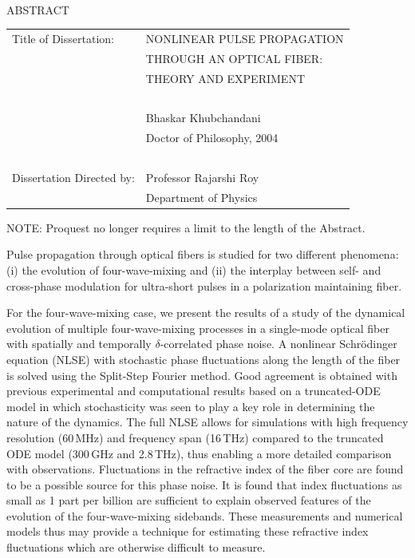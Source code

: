 
\hbox{\ } \vspace{.7in}
\renewcommand{\baselinestretch}{1}
\small \normalsize

\begin{center}
\large{{ABSTRACT}}

\vspace{3em}

\end{center}
\hspace{-.15in}
\begin{tabular}{ll}
Title of Dissertation:    & {\large  NONLINEAR PULSE PROPAGATION }\\
&                     {\large  THROUGH AN OPTICAL FIBER:} \\
&                     {\large  THEORY AND EXPERIMENT} \\
\ \\
&                          {\large  Bhaskar Khubchandani} \\
&                           {\large Doctor of Philosophy, 2004} \\
\ \\
Dissertation Directed by: & {\large  Professor Rajarshi Roy} \\
&               {\large  Department of Physics } \\
\end{tabular}

\vspace{3em}

\renewcommand{\baselinestretch}{2}
\large \normalsize

{\color{red}NOTE:   Proquest no longer requires a limit to the
length of the Abstract.}

 Pulse propagation through optical
fibers is studied for two different phenomena: (i) the evolution
of four-wave-mixing and (ii) the interplay between self- and
cross-phase modulation for ultra-short pulses in a polarization
maintaining fiber.

For the four-wave-mixing case, we present the results of a study
of the dynamical evolution of multiple four-wave-mixing processes
in a single-mode optical fiber with spatially and temporally
$\delta$-correlated phase noise. A nonlinear Schr\"odinger
equation (NLSE) with stochastic phase fluctuations along the
length of the fiber is solved using the Split-Step Fourier method.
Good agreement is obtained with previous experimental and
computational results based on a truncated-ODE model in which
stochasticity was seen to play a key role in determining the
nature of the dynamics. The full NLSE allows for simulations with
high frequency resolution (60\,MHz) and frequency span (16\,THz)
compared to the truncated ODE model (300\,GHz and 2.8\,THz), thus
enabling a more detailed comparison with observations.
Fluctuations in the refractive index of the fiber core are found
to be a possible source for this phase noise. It is found that
index fluctuations as small as 1 part per billion are sufficient
to explain observed features of the evolution of the
four-wave-mixing sidebands. These measurements and numerical
models thus may provide a technique for estimating these
refractive index fluctuations which are otherwise difficult to
measure.

